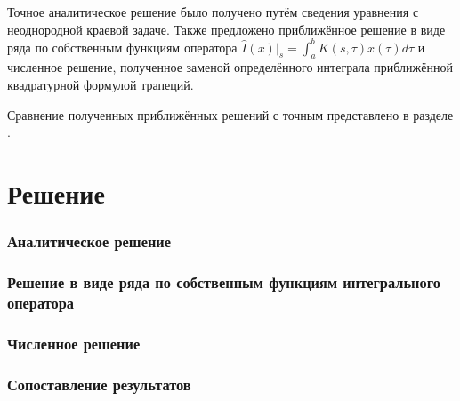\documentclass{article}
\numberwithin{equation}{section}
\providecommand{\at}[1]{\vert_{#1}}
\begin{document}
Точное аналитическое решение было получено путём сведения уравнения с
неоднородной краевой задаче. Также предложено приближённое решение в
виде ряда по собственным функциям оператора $\hat{I}(x)\at{s} =
\int_a^b{K(s, \tau) x(\tau) d\tau}$ и численное решение, полученное
заменой определённого интеграла приближённой квадратурной формулой
трапеций.

Сравнение полученных приближённых решений с точным представлено в
разделе \pageref{sec:comparison}.

\clearpage
\part{Решение}

\section{Аналитическое решение}

\section{Решение в виде ряда по собственным функциям интегрального
  оператора}

\section{Численное решение}

\section{Сопоставление результатов}
\label{sec:comparison}
\end{document}
